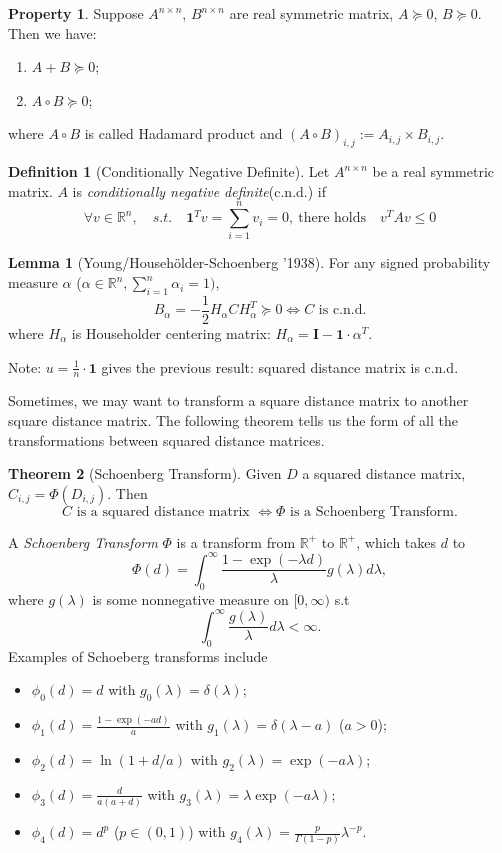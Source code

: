 \documentclass[twoside]{article}
\theoremstyle{definition}
\newtheorem{thm}{Theorem}[section]
\newtheorem{lem}[thm]{Lemma}
\newtheorem*{property}{Property}
\theoremstyle{definition}
\newtheorem*{defn}{Definition}
\theoremstyle{remark}
\def\R{{\mathbb R}}
\begin{document}
\begin{property}
Suppose $A^{n\times n}$, $B^{n\times n}$ are real symmetric matrix, $A\succeq 0$, $B\succeq 0$. Then we have:
\begin{enumerate}
\item $A+B\succeq 0$;
\item $A\circ B\succeq 0$;
\end{enumerate}
where $A\circ B$ is called Hadamard product and $(A\circ B)_{i,j}:=A_{i,j}\times B_{i,j}$.
\end{property}


\begin{defn}[Conditionally Negative Definite]
Let $A^{n\times n}$ be a real symmetric matrix. $A$ is \emph{conditionally negative definite}(c.n.d.) if \\
$$\forall v \in \R^n, \quad s.t.\quad \mathbf{1}^T v=\sum^n_{i=1}v_i=0,\ \text{there holds}\quad  v^TAv \leq 0$$
\end{defn}

\begin{lem}[Young/Househ\"{o}lder-Schoenberg '1938]\label{lem:1} 
For any signed probability measure $\alpha$ ($\alpha \in \R^n,\sum^n_{i=1}\alpha_i=1)$,
$$B_\alpha = -\frac{1}{2}H_\alpha C H_\alpha^T \succeq 0 \iff \mbox{$C$ is c.n.d.} $$
where $H_\alpha$ is Householder centering matrix: $H_\alpha = \mathbf{I} - \mathbf{1}\cdot \alpha^T$.
\end{lem}

Note: $u = \frac{1}{n} \cdot \mathbf{1}$ gives the previous result: squared distance matrix is c.n.d.


Sometimes, we may want to transform a square distance matrix to another square distance matrix. The following theorem tells us the form of all the transformations between squared distance matrices.

\begin{thm}[Schoenberg Transform]
Given $D$ a squared distance matrix, $C_{i,j}=\Phi(D_{i,j})$. Then
$$\mbox{$C$ is a squared distance matrix $\iff \Phi$ is a Schoenberg Transform.}$$
\end{thm}

A \emph{Schoenberg Transform} $\Phi$ is a transform from $\R^+$ to $\R^+$, which takes $d$ to 
$$\Phi (d)=\int_0^\infty \frac{1-\exp{(-\lambda d)}}{\lambda}g(\lambda)d\lambda, $$ 
where $g(\lambda)$ is some nonnegative measure on $[0,\infty)$ s.t 
$$\displaystyle \int_0^\infty \frac{g(\lambda)}{\lambda}d\lambda<\infty.$$
Examples of Schoeberg transforms include 
\begin{itemize}
\item $\phi_0(d)=d$ with $g_0(\lambda)=\delta(\lambda)$;
\item $\displaystyle \phi_1(d) = \frac{1-\exp(-ad)}{a}$ with $g_1(\lambda) = \delta(\lambda-a)$ ($a>0$); 
\item $\phi_2(d) = \ln (1 + d/a)$ with $g_2(\lambda) = \exp(-a \lambda)$; 
\item $\displaystyle \phi_3(d)=\frac{d}{a(a+d)}$ with $g_3(\lambda)=\lambda \exp(-a \lambda)$;
\item $\displaystyle \phi_4(d)=d^p$ ($p\in (0,1)$) with $\displaystyle g_4(\lambda) = \frac{p}{\Gamma(1-p)} \lambda^{-p}$. 
\end{itemize}
\end{document}

